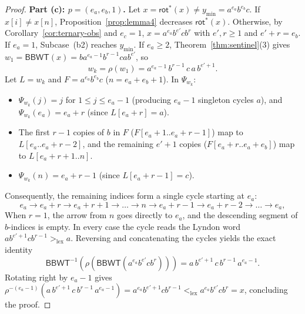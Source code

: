 \documentclass[11pt,a4paper]{article}
\theoremstyle{definition}
\newcommand{\BBWT}{\mathsf{BBWT}}
\newcommand{\rot}{\mathsf{rot}}
\newcommand{\lex}{\mathrm{lex}}
\begin{document}
\begin{proof}
\medskip
\noindent\textbf{Part (c): $p = (e_a, e_b, 1)$.}
Let $x = \rot^*(x) \neq y_{\min} = a^{e_a} b^{e_b} c$. If $x[i] \neq x[n]$, Proposition~\ref{prop:lemma4} decreases $\rot^*(x)$. Otherwise, by Corollary~\ref{cor:ternary-obs} and $e_c = 1$, $x = a^{e_a} b^{e'} c b^r$ with $e', r \ge 1$ and $e' + r = e_b$. If $e_a = 1$, Subcase~(b2) reaches $y_{\min}$. If $e_a \ge 2$, Theorem~\ref{thm:sentinel}(3) gives $w_1 = \BBWT(x) = b a^{e_a - 1} b^{r-1} c a b^{e'}$, so
\[
w_k = \rho(w_1) = a^{e_a - 1} \, b^{r-1} \, c \, a \, b^{e'+1}.
\]
Let $L = w_k$ and $F = a^{e_a} b^{e_b} c$ ($n = e_a + e_b + 1$). In $\Psi_{w_k}$:
\begin{itemize}[leftmargin=*]
    \item $\Psi_{w_k}(j) = j$ for $1 \le j \le e_a - 1$ (producing $e_a - 1$ singleton cycles $a$), and $\Psi_{w_k}(e_a) = e_a + r$ (since $L[e_a + r] = a$).
    \item The first $r - 1$ copies of $b$ in $F$ ($F[e_a + 1 .. e_a + r - 1]$) map to $L[e_a .. e_a + r - 2]$, and the remaining $e'+1$ copies ($F[e_a + r .. e_a + e_b]$) map to $L[e_a + r + 1 .. n]$.
    \item $\Psi_{w_k}(n) = e_a + r - 1$ (since $L[e_a + r - 1] = c$).
\end{itemize}
Consequently, the remaining indices form a single cycle starting at $e_a$:
\[
e_a \to e_a + r \to e_a + r + 1 \to \dots \to n \to e_a + r - 1 \to e_a + r - 2 \to \dots \to e_a,
\]
When $r=1$, the arrow from $n$ goes directly to $e_a$, and the descending segment of $b$-indices is empty. In every case the cycle reads the Lyndon word $ab^{e'+1}cb^{r-1}>_{\lex}a$. Reversing and concatenating the cycles yields the exact identity
\begin{equation}
\label{eq:ec1-transfer}
\BBWT^{-1}(\rho(\BBWT(a^{e_a} b^{e'} c b^r))) = a \, b^{e'+1} \, c \, b^{r-1} \, a^{e_a - 1}.
\end{equation}
Rotating right by $e_a - 1$ gives $\rho^{-(e_a - 1)}(a \, b^{e'+1} \, c \, b^{r-1} \, a^{e_a - 1}) = a^{e_a} b^{e'+1} c b^{r-1} <_{\lex} a^{e_a} b^{e'} c b^r = x$, concluding the proof.
\end{proof}
\end{document}
